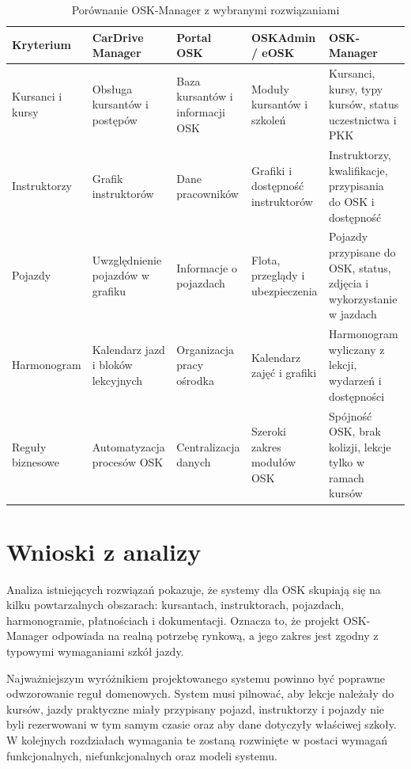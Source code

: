 \begin{table}[H]
  \centering
  \scriptsize
  \caption{Porównanie OSK-Manager z wybranymi rozwiązaniami}
  \label{tab:porownanieRozwiazanOsk}
  \begin{tabularx}{\textwidth}{>{\raggedright\arraybackslash}p{3cm}>{\raggedright\arraybackslash}X>{\raggedright\arraybackslash}X>{\raggedright\arraybackslash}X>{\raggedright\arraybackslash}X}
    \toprule
    \textbf{Kryterium} & \textbf{CarDrive Manager} & \textbf{Portal OSK} & \textbf{OSKAdmin / eOSK} & \textbf{OSK-Manager} \\
    \midrule
    Kursanci i kursy & Obsługa kursantów i postępów & Baza kursantów i informacji OSK & Moduły kursantów i szkoleń & Kursanci, kursy, typy kursów, status uczestnictwa i PKK \\
    \midrule
    Instruktorzy & Grafik instruktorów & Dane pracowników & Grafiki i dostępność instruktorów & Instruktorzy, kwalifikacje, przypisania do OSK i dostępność \\
    \midrule
    Pojazdy & Uwzględnienie pojazdów w grafiku & Informacje o pojazdach & Flota, przeglądy i ubezpieczenia & Pojazdy przypisane do OSK, status, zdjęcia i wykorzystanie w jazdach \\
    \midrule
    Harmonogram & Kalendarz jazd i bloków lekcyjnych & Organizacja pracy ośrodka & Kalendarz zajęć i grafiki & Harmonogram wyliczany z lekcji, wydarzeń i dostępności \\
    \midrule
    Reguły biznesowe & Automatyzacja procesów OSK & Centralizacja danych & Szeroki zakres modułów OSK & Spójność OSK, brak kolizji, lekcje tylko w ramach kursów \\
    \bottomrule
  \end{tabularx}
\end{table}

\section{Wnioski z analizy}
\label{sec:wnioskiAnaliza}

Analiza istniejących rozwiązań pokazuje, że systemy dla OSK skupiają się na kilku powtarzalnych obszarach: kursantach, instruktorach, pojazdach, harmonogramie, płatnościach i dokumentacji. Oznacza to, że projekt OSK-Manager odpowiada na realną potrzebę rynkową, a jego zakres jest zgodny z typowymi wymaganiami szkół jazdy.

Najważniejszym wyróżnikiem projektowanego systemu powinno być poprawne odwzorowanie reguł domenowych. System musi pilnować, aby lekcje należały do kursów, jazdy praktyczne miały przypisany pojazd, instruktorzy i pojazdy nie byli rezerwowani w tym samym czasie oraz aby dane dotyczyły właściwej szkoły. W kolejnych rozdziałach wymagania te zostaną rozwinięte w postaci wymagań funkcjonalnych, niefunkcjonalnych oraz modeli systemu.
